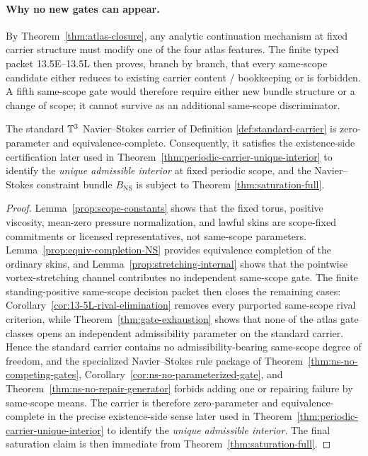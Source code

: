 \paragraph{Why no new gates can appear.}
By Theorem~\ref{thm:atlas-closure}, any analytic continuation mechanism at fixed carrier structure
must modify one of the four atlas features. The finite typed packet
13.5E--13.5L then proves, branch by branch, that every same-scope candidate either reduces to
existing carrier content / bookkeeping or is forbidden. A fifth same-scope gate would therefore
require either new bundle structure or a change of scope; it cannot survive as an additional
same-scope discriminator.
\begin{theorem}\label{thm:ns-zero-parameter}
The standard $\mathbb{T}^3$ Navier--Stokes carrier of Definition \ref{def:standard-carrier} is
zero-parameter and equivalence-complete. Consequently, it satisfies the existence-side certification
later used in Theorem~\ref{thm:periodic-carrier-unique-interior} to identify the \emph{unique admissible interior}
at fixed periodic scope, and the Navier--Stokes constraint bundle $B_{\mathrm{NS}}$ is subject to
Theorem \ref{thm:saturation-full}.
\end{theorem}

\begin{proof}
Lemma~\ref{prop:scope-constants} shows that the fixed torus, positive viscosity, mean-zero pressure
normalization, and lawful skins are scope-fixed commitments or licensed representatives, not
same-scope parameters. Lemma~\ref{prop:equiv-completion-NS} provides equivalence completion of the
ordinary skins, and Lemma~\ref{prop:stretching-internal} shows that the pointwise vortex-stretching
channel contributes no independent same-scope gate. The finite standing-positive same-scope decision packet then closes
the remaining cases: Corollary~\ref{cor:13-5L-rival-elimination} removes every purported same-scope
rival criterion, while Theorem~\ref{thm:gate-exhaustion} shows that none of the atlas gate classes
opens an independent admissibility parameter on the standard carrier. Hence the standard carrier
contains no admissibility-bearing same-scope degree of freedom, and the specialized Navier--Stokes
rule package of Theorem~\ref{thm:ns-no-competing-gates},
Corollary~\ref{cor:ns-no-parameterized-gate}, and Theorem~\ref{thm:ns-no-repair-generator} forbids
adding one or repairing failure by same-scope means. The carrier is therefore zero-parameter and
equivalence-complete in the precise existence-side sense later used in
Theorem~\ref{thm:periodic-carrier-unique-interior} to identify the \emph{unique admissible interior}.
The final saturation claim is then immediate from Theorem~\ref{thm:saturation-full}.
\end{proof}

